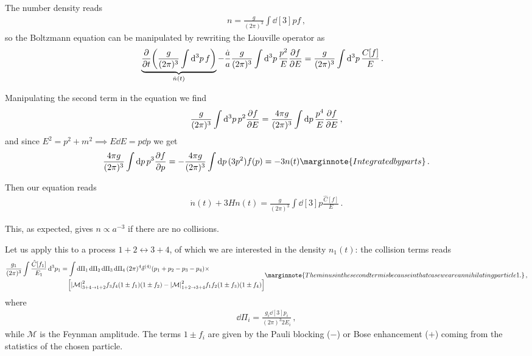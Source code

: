 \documentclass[main.tex]{subfiles}
\begin{document}
The number density reads 
%
\begin{align}
n = \frac{g}{(2 \pi )^3} \int \dd[3]{p} f
\,,
\end{align}
%
so the Boltzmann equation can be manipulated by rewriting the Liouville operator as 
%
\begin{align}
\underbrace{\pdv{}{t} \qty( \frac{g}{(2 \pi )^3} \int \dd[3]{p} f)}_{\dot{n}(t)} - \frac{\dot{a}}{a} \frac{g}{(2 \pi )^3}\int \dd[3]{p} \frac{p^2}{E} \pdv{f}{E} &= 
\frac{g}{(2 \pi )^3} \int \dd[3]{p} \frac{C[f]}{E}
\,.
\end{align}
%

Manipulating the second term in the equation we find
%
\begin{align}
\frac{g}{(2 \pi )^3} \int \dd[3]{p} p^2 \pdv{f}{E} 
= \frac{4 \pi g}{(2 \pi )^3} \int \dd{p} \frac{p^{4}}{E} \pdv{f}{E}
\,,
\end{align}
%
and since \(E^2 = p^2 + m^2 \implies E \dd{E} =p \dd{p}\) we get 
%
\begin{align}
\frac{4 \pi g}{(2 \pi )^3} \int \dd{p} p^3 \pdv{f}{p} 
= -\frac{4 \pi g}{(2 \pi)^3} \int \dd{p} (3 p^2) f(p)
= -3 n(t)
\marginnote{Integrated by parts}
\,.
\end{align}

Then our equation reads 
%
\begin{align}
\dot{n}(t) + 3 H n(t) = \frac{g}{(2 \pi )^3} \int \dd[3]{p} \frac{\hat{C}[f]}{E}
\,.
\end{align}

This, as expected, gives \(n \propto a^{-3}\) if there are no collisions.

Let us apply this to a process \(1 + 2 \leftrightarrow 3 + 4\), of which we are interested in the density \(n_1 (t)\): the collision terms reads 
%
\begin{align}
\begin{split}
\frac{g_1 }{(2 \pi )^3} \int \frac{\hat{C}[f_1 ]}{E_1 } \dd[3]{p_1 } &=
\int \dd{\Pi_1 }\dd{\Pi_2 }\dd{\Pi_3 }\dd{\Pi_4 }
(2 \pi )^{4} \delta^{(4)}(p_1 + p_2 - p_3 - p_4 ) \times \\
&\phantom{=}\ 
\qty[
    \abs{\mathcal{M}}^2_{3 + 4 \to 1 + 2} f_3 f_4 (1 \pm f_1 ) (1 \pm f_2 ) 
    -
    \abs{\mathcal{M}}^2_{1 + 2 \to 3 + 4} f_1 f_2 (1 \pm f_3 ) (1 \pm f_4 ) 
    ]
\end{split}
\marginnote{The minus in the second term is because in that case we are annihilating particle 1.}
\,,
\end{align}
%
where 
%
\begin{align}
\dd{\Pi _i} = \frac{g_i \dd[3]{p_i}}{(2 \pi )^3 2 E_i} 
\,,
\end{align}
%
while \(\mathcal{M}\) is the Feynman amplitude.
The terms \(1 \pm f_i\) are given by the Pauli blocking (\(-\)) or Bose enhancement (\(+\)) coming from the statistics of the chosen particle.
\end{document}
